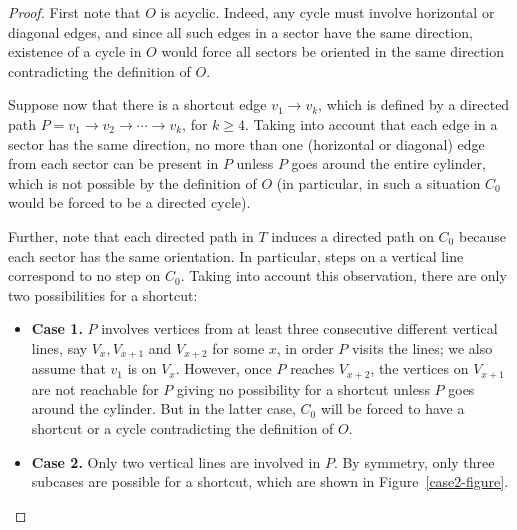 \documentclass[12pt]{article}
\numberwithin{equation}{section}
\begin{document}
\begin{proof}
First note that $O$ is acyclic. Indeed, any cycle must involve horizontal or diagonal edges, and since all such edges in a sector have the same direction, existence of a cycle in $O$ would force all sectors be oriented in the same direction contradicting the definition of $O$.

Suppose now that there is a shortcut edge $v_1\rightarrow v_k$, which is defined by a directed path $P=v_1\rightarrow v_2 \rightarrow \cdots \rightarrow v_k$, for $k\geq 4$. Taking into account that each edge in a sector has the same direction, no more than one (horizontal or diagonal) edge from each sector can be present in $P$ unless $P$ goes around the entire cylinder, which is not possible by the definition of $O$ (in particular, in such a situation $C_0$ would be forced to be a directed cycle).

Further, note that each directed path in $T$ induces a directed path on $C_0$ because each sector has the same orientation. In particular, steps on a vertical line correspond to no step on $C_0$. Taking into account this observation, there are only two possibilities for a shortcut:
\begin{itemize}

\item {\bf Case 1.} $P$ involves vertices from at least three consecutive different vertical lines, say $ V_x,  V_{x+1}$ and $V_{x+2}$ for some $x$, in order $P$ visits the lines; we also assume that $v_1$ is on $V_x$. However, once $P$ reaches $V_{x+2}$, the vertices on $V_{x+1}$ are not reachable for $P$ giving no possibility for a shortcut unless $P$ goes around the cylinder. But in the latter case, $C_0$ will be forced to have a shortcut or a cycle contradicting the definition of $O$.

\item {\bf Case 2.} Only two vertical lines are involved in $P$. By symmetry, only three subcases are possible for a  shortcut, which are shown in Figure~\ref{case2-figure}.

\begin{figure}[!htbp]
\begin{center}
\end{center}
\end{figure}
\end{itemize}
\end{proof}
\end{document}
